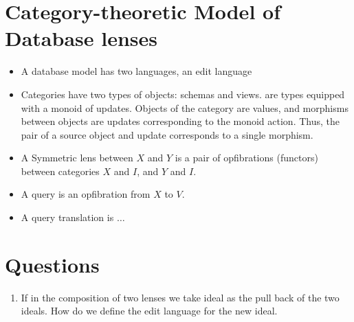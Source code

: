 \documentclass[a4paper,10pt]{article}
\begin{document}
\section{Category-theoretic Model of Database lenses}
\begin{itemize}
 \item A database model has two languages, an edit language
 \item Categories have two types of objects: schemas and views. are types equipped with a monoid of updates. Objects of the category are values, and morphisms between objects are updates corresponding to the monoid action. Thus, the pair of a source object and update corresponds to a single morphism. 
 \item A Symmetric lens between $X$ and $Y$ is a pair of opfibrations (functors) between categories $X$ and $I$, and $Y$ and $I$.
 \item A query is an opfibration from $X$ to $V$.
 \item A query translation is $\ldots$
\end{itemize}


\section{Questions}
\begin{enumerate}
 \item If in the composition of two lenses we take ideal as the pull back of the two ideals. How do we define the edit language for the new ideal.
\end{enumerate}



\end{document}
